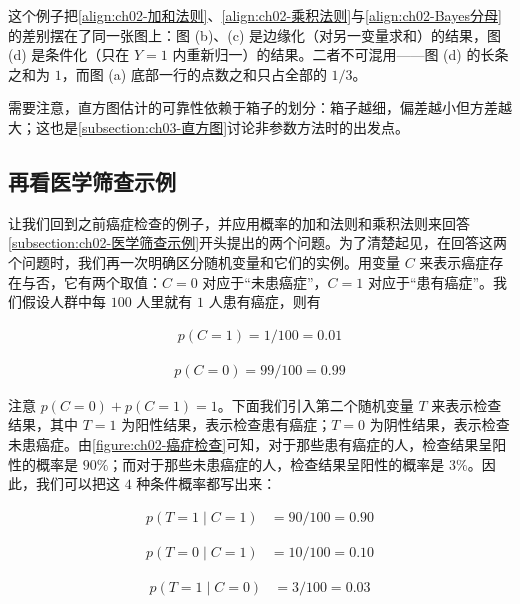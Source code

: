 \documentclass[../../main.tex]{subfiles}
\begin{document}
\begin{remark}
这个例子把\eqref{align:ch02-加和法则}、\eqref{align:ch02-乘积法则}与\eqref{align:ch02-Bayes分母}的差别摆在了同一张图上：图 (b)、(c) 是边缘化（对另一变量求和）的结果，图 (d) 是条件化（只在 $Y=1$ 内重新归一）的结果。二者不可混用——图 (d) 的长条之和为 $1$，而图 (a) 底部一行的点数之和只占全部的 $1/3$。

需要注意，直方图估计的可靠性依赖于箱子的划分：箱子越细，偏差越小但方差越大；这也是\cref{subsection:ch03-直方图}讨论非参数方法时的出发点。
\end{remark}

\subsection{再看医学筛查示例}\label{subsection:ch02-再看医学筛查示例}

让我们回到之前癌症检查的例子，并应用概率的加和法则和乘积法则来回答\cref{subsection:ch02-医学筛查示例}开头提出的两个问题。为了清楚起见，在回答这两个问题时，我们再一次明确区分随机变量和它们的实例。用变量 $C$ 来表示癌症存在与否，它有两个取值：$C=0$ 对应于“未患癌症”，$C=1$ 对应于“患有癌症”。我们假设人群中每 $100$ 人里就有 $1$ 人患有癌症，则有

\begin{align}
  p(C=1) = 1/100 = 0.01
  \label{align:ch02-患癌先验}
\end{align}

\begin{align}
  p(C=0) = 99/100 = 0.99
  \label{align:ch02-未患癌先验}
\end{align}

注意 $p(C=0)+p(C=1)=1$。下面我们引入第二个随机变量 $T$ 来表示检查结果，其中 $T=1$ 为阳性结果，表示检查患有癌症；$T=0$ 为阴性结果，表示检查未患癌症。由\cref{figure:ch02-癌症检查}可知，对于那些患有癌症的人，检查结果呈阳性的概率是 $90\%$；而对于那些未患癌症的人，检查结果呈阳性的概率是 $3\%$。因此，我们可以把这 $4$ 种条件概率都写出来：

\begin{align}
  p(T=1\mid C=1) &= 90/100 = 0.90
  \label{align:ch02-条件概率a}
\end{align}

\begin{align}
  p(T=0\mid C=1) &= 10/100 = 0.10
  \label{align:ch02-条件概率b}
\end{align}

\begin{align}
  p(T=1\mid C=0) &= 3/100 = 0.03
  \label{align:ch02-条件概率c}
\end{align}
\end{document}
